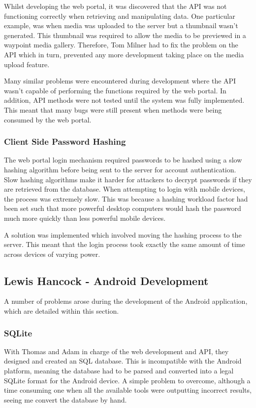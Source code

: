 \documentclass[11pt,a4paper]{report}
\begin{document}
Whilst developing the web portal, it was discovered that the API was not functioning correctly when retrieving and manipulating data. One particular example, was when media was uploaded to the server but a thumbnail wasn't generated. This thumbnail was required to allow the media to be previewed in a waypoint media gallery. Therefore, Tom Milner had to fix the problem on the API which in turn, prevented any more development taking place on the media upload feature.

Many similar problems were encountered during development where the API wasn't capable of performing the functions required by the web portal. In addition, API methods were not tested until the system was fully implemented. This meant that many bugs were still present when methods were being consumed by the web portal.

\subsubsection{Client Side Password Hashing}
The web portal login mechanism required passwords to be hashed using a slow hashing algorithm before being sent to the server for account authentication. Slow hashing algorithms make it harder for attackers to decrypt passwords if they are retrieved from the database. When attempting to login with mobile devices, the process was extremely slow. This was because a hashing workload factor had been set such that more powerful desktop computers would hash the password much more quickly than less powerful mobile devices.

A solution was implemented which involved moving the hashing process to the server. This meant that the login process took exactly the same amount of time across devices of varying power.

\subsection{Lewis Hancock - Android Development}
A number of problems arose during the development of the Android application, which are detailed within this section.

\subsubsection{SQLite}
With Thomas and Adam in charge of the web development and API, they designed and created an SQL database. This is incompatible with the Android platform, meaning the database had to be parsed and converted into a legal SQLite format for the Android device. A simple problem to overcome, although a time consuming one when all the available tools were outputting incorrect results, seeing me convert the database by hand.
\end{document}
